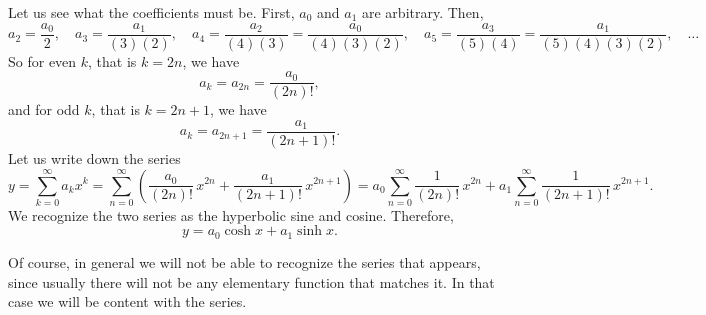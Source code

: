 \begin{example}
Let us see what the coefficients
must be.  First, $a_0$ and $a_1$ are arbitrary.  Then,
\begin{equation*}
a_2 = \frac{a_0}{2}, \quad
a_3 = \frac{a_1}{(3)(2)}, \quad
a_4 = \frac{a_2}{(4)(3)} = \frac{a_0}{(4)(3)(2)}, \quad
a_5 = \frac{a_3}{(5)(4)} = \frac{a_1}{(5)(4)(3)(2)}, \quad \ldots
\end{equation*}
So for even $k$, that is $k=2n$,
we have
\begin{equation*}
a_k = a_{2n} = \frac{a_0}{(2n)!} ,
\end{equation*}
and for odd $k$, that is $k=2n+1$, we have
\begin{equation*}
a_k = a_{2n+1} = \frac{a_1}{(2n+1)!} .
\end{equation*}
Let us write down the series
\begin{equation*}
y =
\sum_{k=0}^\infty
a_k x^k
=
\sum_{n=0}^\infty
\left(
\frac{a_0}{(2n)!} \,x^{2n}
+
\frac{a_1}{(2n+1)!} \,x^{2n+1}
\right)
=
a_0
\sum_{n=0}^\infty
\frac{1}{(2n)!} \,x^{2n}
+
a_1
\sum_{n=0}^\infty
\frac{1}{(2n+1)!} \,x^{2n+1} .
\end{equation*}
We recognize the two series as the hyperbolic sine and cosine.
Therefore,
\begin{equation*}
y =
a_0 \cosh x + a_1 \sinh x .
\end{equation*}
\end{example}

Of course, in general we will not be able to recognize 
the series that appears, since usually there will not be
any elementary function that matches it.  In that case we will be
content with the series.

